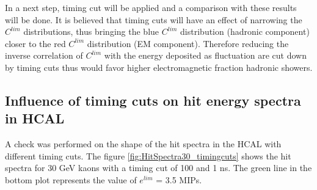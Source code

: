 
In a next step, timing cut will be applied and a comparison with these results will be done. It is believed that timing cuts will have an effect of narrowing the $C^{lim}$ distributions, thus bringing the blue $C^{lim}$ distribution (hadronic component) closer to the red $C^{lim}$ distribution (EM component). Therefore reducing the inverse correlation of $C^{lim}$ with the energy deposited as fluctuation are cut down by timing cuts thus would favor higher electromagnetic fraction hadronic showers.

\subsection{Influence of timing cuts on hit energy spectra in HCAL}

A check was performed on the shape of the hit spectra in the HCAL with different timing cuts. The figure \ref{fig:HitSpectra30_timingcuts} shows the hit spectra for 30 GeV kaons with a timing cut of 100 and 1 ns. The green line in the bottom plot represents the value of $e^{lim}$ = 3.5 MIPs.



